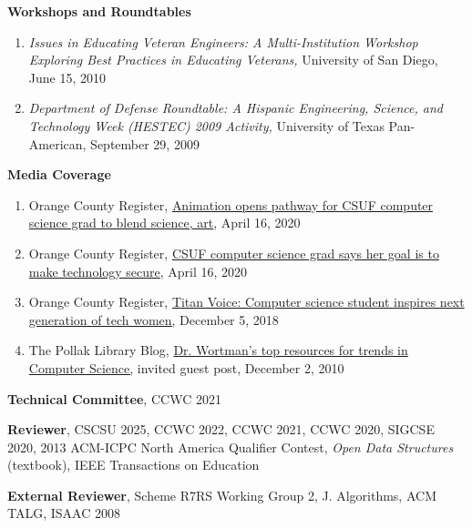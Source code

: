 \documentclass[11pt]{letter}
\begin{document}
\textbf{Workshops and Roundtables}
\begin{enumerate}
\item \emph{Issues in Educating Veteran Engineers: A Multi-Institution Workshop Exploring Best Practices in Educating Veterans,} University of San Diego, June 15, 2010
\item \emph{Department of Defense Roundtable: A Hispanic Engineering, Science, and Technology Week (HESTEC) 2009 Activity,} University of Texas Pan-American, September 29, 2009
\end{enumerate}

\textbf{Media Coverage}
\begin{enumerate}
\item Orange County Register, \href{https://www.ocregister.com/2020/04/16/animation-opens-pathway-for-csuf-computer-science-grad-to-blend-science-and-art/}{Animation opens pathway for CSUF computer science grad to blend science, art}, April 16, 2020
\item Orange County Register, \href{https://www.ocregister.com/2020/04/16/csuf-computer-science-grad-says-her-goal-is-to-make-technology-secure/}{CSUF computer science grad says her goal is to make technology secure}, April 16, 2020
\item Orange County Register, \href{https://www.ocregister.com/2018/12/05/titan-voice-computer-science-student-inspires-next-generation-of-tech-women/}{Titan Voice: Computer science student inspires next generation of tech women,} December 5, 2018
\item The Pollak Library Blog, \href{http://libphp2006.fullerton.edu/blogs/news/2010/12/02/dr-wortmans-top-resources-for-trends-in-computer-science/}{Dr. Wortman's top resources for trends in Computer Science,} invited guest post, December 2, 2010
\end{enumerate}

\textbf{Technical Committee}, CCWC 2021

\textbf{Reviewer}, CSCSU 2025, CCWC 2022, CCWC 2021, CCWC 2020, SIGCSE 2020, 2013 ACM-ICPC North America Qualifier Contest, \emph{Open Data Structures} (textbook), IEEE Transactions on Education

\textbf{External Reviewer}, Scheme R7RS Working Group 2, J. Algorithms, ACM TALG, ISAAC 2008

\end{document}

